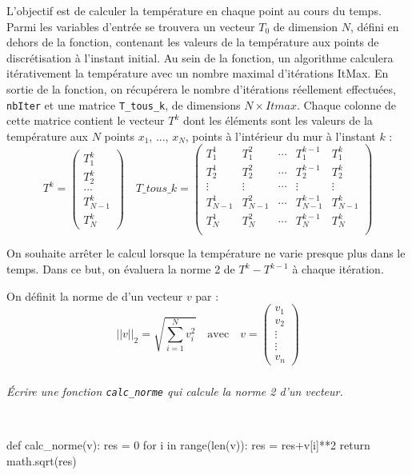 \documentclass[10pt,fleqn]{article} %
\begin{document}
L'objectif est de calculer la température en chaque point au cours du temps. Parmi les variables
d’entrée se trouvera un vecteur $T_0$ de dimension $N$, défini en dehors de la fonction, contenant les valeurs de la température aux points de discrétisation à l’instant initial. Au sein de la fonction, un algorithme calculera itérativement la température avec un nombre maximal d’itérations ItMax. En sortie de la fonction, on récupérera le nombre d’itérations réellement effectuées, \texttt{nbIter} et une matrice \texttt{T\_tous\_k}, de dimensions $N\times Itmax$.  Chaque colonne de cette matrice contient le vecteur $T^k$ dont les éléments sont les valeurs de la température aux $N$ points $x_1$, ..., $x_N$, points à l'intérieur du mur à l'instant $k$ :
$$
T^k = \begin{pmatrix} T_1^k \\  T_2 ^k \\ ... \\  T_{N-1}^{k} \\ T_{N}^{k}  \end{pmatrix}
\quad
T\_tous\_k = 
\begin{pmatrix} 
T_1^1   & T_1^2  & \cdots & T_1^{k-1} & T_1^{k}  \\
T_2^1   & T_2^2  & \cdots & T_2^{k-1} & T_2^{k}  \\
\vdots & \vdots & \cdots & \vdots & \vdots \\
T_{N-1}^1   & T_{N-1}^2  & \cdots & T_{N-1}^{k-1} & T_{N-1}^{k}  \\
T_{N}^1   & T_{N}^2  & \cdots & T_{N}^{k-1} & T_{N}^{k}  \\
 \end{pmatrix}
$$


On souhaite arrêter le calcul lorsque la température ne varie presque plus dans le temps. Dans ce but, on évaluera la norme 2 de $T^k - T^{k-1}$ à chaque itération. 
\begin{defi}
On définit la norme de d'un vecteur $v$ par : 
$$
||v||_2 = \sqrt{\sum\limits_{i=1}^{N}v_i^2} \quad \text{avec} \quad v=\begin{pmatrix} v_1 \\ v_2 \\ \vdots \\ \vdots \\ v_n \end{pmatrix}
$$
\end{defi}



\subparagraph{}
\textit{Écrire une fonction \texttt{calc\_norme} qui calcule la norme 2 d'un vecteur. }
\ifprof
\begin{corrige}
 ~\\
\begin{python}
def calc_norme(v):
    res = 0
    for i in range(len(v)):
        res = res+v[i]**2
    return math.sqrt(res)        
\end{python}
\end{corrige}
\else
\fi
\end{document}
